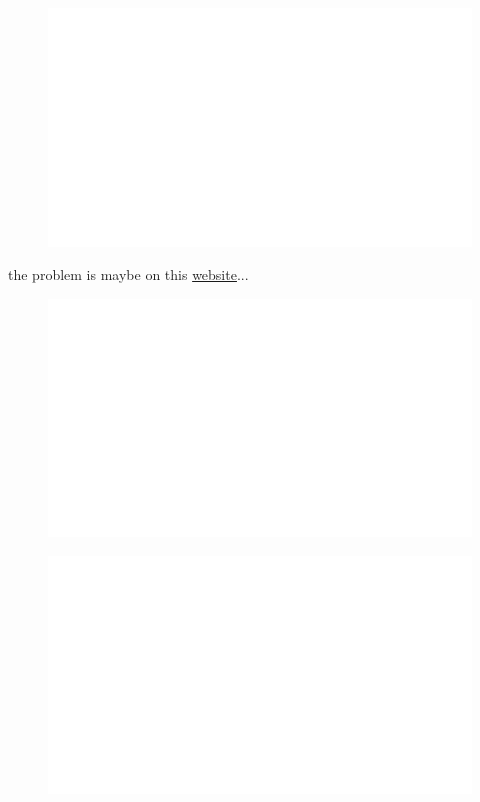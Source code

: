 \begin{centering}
    \begin{figure}
        \centering
        \includegraphics[width=\textwidth]{whyareyoucheckingthenameofthisfile.png}
    \end{figure}
\end{centering}
\noindent
the problem is maybe on this \href{https://pofinal24.kattis.com/contests/pofinal24}{website}...


\begin{centering}
    \begin{figure}[h]
        \centering
        \includegraphics[width=\textwidth]{whyareyoucheckingthenameofthisfile.png}
    \end{figure}
\end{centering}

\begin{centering}
    \begin{figure}[h!]
        \centering
        \includegraphics[width=\textwidth]{whyareyoucheckingthenameofthisfile.png}
    \end{figure}
\end{centering}


